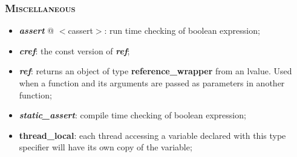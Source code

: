 \documentclass[10pt]{article}
\begin{document}
\begin{multicols*}{4}
{{\begin{itemize}[leftmargin=*,topsep=0.25pt]
\end{itemize}

\subsubsection*{\textsc{Miscellaneous}} 
\begin{itemize}[leftmargin=*,topsep=0.25pt]
  \setlength\itemsep{-1.8pt}
\item  \emph{\textbf{assert}} @ $<$cassert$>$: run time checking of boolean expression; 
\item  \emph{\textbf{cref}}: the const version of \emph{\textbf{ref}};
\item  \emph{\textbf{ref}}: returns an object of type \textbf{reference\_wrapper} from an lvalue. Used when a function and its arguments are passed as parameters in another function;
\item  \emph{\textbf{static\_assert}}: compile time checking of boolean expression;
\item  {\textbf{thread\_local}}: each thread accessing a variable declared with this type specifier will have its  own copy of the variable; 
\end{itemize}


}

}

\end{multicols*}
\end{document}
